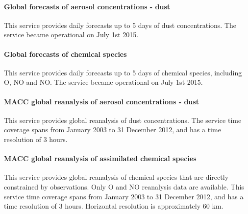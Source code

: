 \documentclass[9pt]{report}
\begin{document}
\paragraph{Global forecasts of aerosol concentrations - dust}\label{sec-global-forecasts-of-aerosol-concentrations---dust}%

\noindent{}\mdbr
{}This service provides daily forecasts up to 5 days of dust concentrations.
The service became operational on July 1st 2015.%

\paragraph{Global forecasts of chemical species}\label{sec-global-forecasts-of-chemical-species}%

\noindent{}\mdbr
{}This service provides daily forecasts up to 5 days of chemical species, including O, NO and NO.
The service became operational on July 1st 2015.%

\paragraph{MACC global reanalysis of aerosol concentrations - dust}\label{sec-macc-global-reanalysis-of-aerosol-concentrations---dust}%

\noindent{}\mdbr
{}This service provides global reanalysis of dust concentrations.
The service time coverage spans from January 2003 to 31 December 2012, and has a time resolution of 3 hours.%

\paragraph{MACC global reanalysis of assimilated chemical species}\label{sec-macc-global-reanalysis-of-assimilated-chemical-species}%

\noindent{}\mdbr
{}This service provides global reanalysis of chemical species that are directly constrained by observations.
Only O and NO reanalysis data are available.
This service time coverage spans from January 2003 to 31 December 2012, and has a time resolution of 3 hours.
Horizontal resolution is approximately 60 km.%
\end{document}
